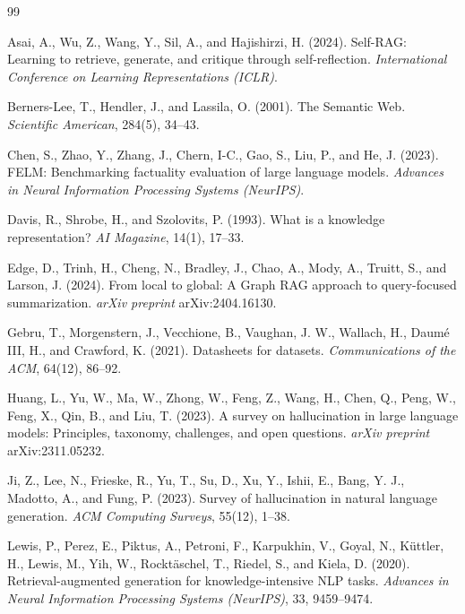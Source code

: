 \documentclass[11pt]{article}
\begin{document}
\begin{thebibliography}{99}

Asai, A., Wu, Z., Wang, Y., Sil, A., and Hajishirzi, H. (2024).
Self-RAG: Learning to retrieve, generate, and critique through self-reflection.
\emph{International Conference on Learning Representations (ICLR)}.

Berners-Lee, T., Hendler, J., and Lassila, O. (2001).
The Semantic Web.
\emph{Scientific American}, 284(5), 34--43.

Chen, S., Zhao, Y., Zhang, J., Chern, I-C., Gao, S., Liu, P., and He, J. (2023).
FELM: Benchmarking factuality evaluation of large language models.
\emph{Advances in Neural Information Processing Systems (NeurIPS)}.

Davis, R., Shrobe, H., and Szolovits, P. (1993).
What is a knowledge representation?
\emph{AI Magazine}, 14(1), 17--33.

Edge, D., Trinh, H., Cheng, N., Bradley, J., Chao, A., Mody, A., Truitt, S., and Larson, J. (2024).
From local to global: A Graph RAG approach to query-focused summarization.
\emph{arXiv preprint} arXiv:2404.16130.

Gebru, T., Morgenstern, J., Vecchione, B., Vaughan, J. W., Wallach, H., Daum\'e III, H., and Crawford, K. (2021).
Datasheets for datasets.
\emph{Communications of the ACM}, 64(12), 86--92.

Huang, L., Yu, W., Ma, W., Zhong, W., Feng, Z., Wang, H., Chen, Q., Peng, W., Feng, X., Qin, B., and Liu, T. (2023).
A survey on hallucination in large language models: Principles, taxonomy, challenges, and open questions.
\emph{arXiv preprint} arXiv:2311.05232.

Ji, Z., Lee, N., Frieske, R., Yu, T., Su, D., Xu, Y., Ishii, E., Bang, Y. J., Madotto, A., and Fung, P. (2023).
Survey of hallucination in natural language generation.
\emph{ACM Computing Surveys}, 55(12), 1--38.

Lewis, P., Perez, E., Piktus, A., Petroni, F., Karpukhin, V., Goyal, N., K\"uttler, H., Lewis, M., Yih, W., Rockt\"aschel, T., Riedel, S., and Kiela, D. (2020).
Retrieval-augmented generation for knowledge-intensive NLP tasks.
\emph{Advances in Neural Information Processing Systems (NeurIPS)}, 33, 9459--9474.


\end{thebibliography}
\end{document}
